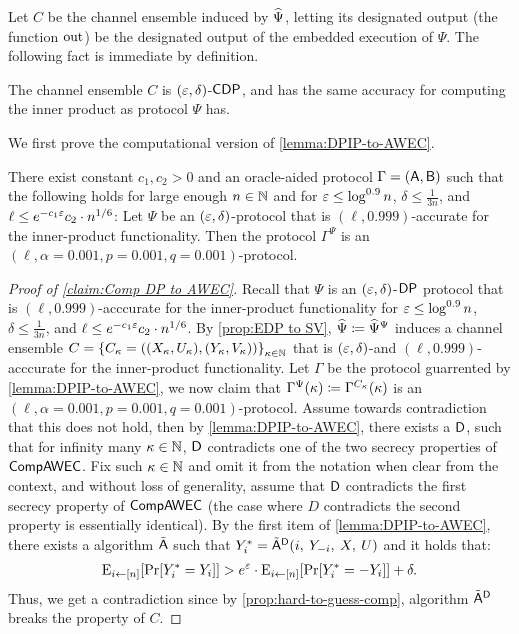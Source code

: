 Let $C$ be the channel ensemble induced by $\widehat{\Psi}$, letting its designated output (the function ${\rm out}$) be the designated output of the embedded execution of $\Psi$. The following fact is immediate by definition.

\begin{proposition}\label{prop:EDP to SV}
	The channel ensemble $C$ is $(\varepsilon,\delta)$-${\sf CDP}$, and has the same accuracy for computing the inner product as protocol $\Psi$ has.
\end{proposition}


We first prove the computational version of \cref{lemma:DPIP-to-AWEC}.
\begin{claim}\label{claim:Comp DP to AWEC}
    There exist constant $c_1,c_2 > 0$ and an oracle-aided \ppt protocol $\Gamma=(\mathsf{A},\mathsf{B})$ such that the following holds for large enough $n \in {\mathbb{N}}$ and for 
	$\varepsilon \leq \log^{0.9} n$, $\delta \leq \frac1{3n}$, and $\ell \leq e^{-c_1  \varepsilon}  c_2\cdot n^{1/6}$:
    Let $\Psi$ be an $(\varepsilon,\delta)$-\CDP protocol that is $(\ell,0.999)$-accurate for the inner-product functionality. Then the protocol $\Gamma^{\Psi}$ is an  $(\ell, \alpha=0.001, p=0.001, q=0.001)$-\CompAWEC protocol.
\end{claim}
\begin{proof}[Proof of \cref{claim:Comp DP to AWEC}]
Recall that $\Psi$ is an $(\varepsilon,\delta)$-${\sf DP}$ protocol that is $(\ell,0.999)$-acccurate for the inner-product functionality for 
	$\varepsilon \leq \log^{0.9} n$, $\delta \leq \frac1{3n}$, and $\ell \leq e^{-c_1  \varepsilon}  c_2\cdot n^{1/6}$. By \cref{prop:EDP to SV}, $\widehat{\Psi}\coloneqq\widehat{\Psi}^\Psi$ induces a channel ensemble $C=\set{C_\pk=((X_\pk,U_\pk),(Y_\pk,V_\pk))}_{\pk\in\N}$ that is $(\varepsilon,\delta)$-\CDP and $(\ell,0.999)$-acccurate for the inner-product functionality. Let $\Gamma$ be the \ppt protocol guarrented by \cref{lemma:DPIP-to-AWEC}, we now claim that $\Gamma^{\Psi}(\kappa)\coloneqq\Gamma^{C_\kappa}(\kappa)$ is an $(\ell, \alpha=0.001, p=0.001, q=0.001)$-\CompAWEC protocol. %
Assume towards contradiction that this does not hold, then by \cref{lemma:DPIP-to-AWEC}, there exists a \ppt $\mathsf{D}$, such that for infinity many $\kappa\in{\mathbb{N}}$, $\mathsf{D}$ contradicts one of the two secrecy properties of ${\sf CompAWEC}$. Fix such $\kappa\in{\mathbb{N}}$ and omit it from the notation when clear from the context, and without loss of generality, assume that $\mathsf{D}$ contradicts the first secrecy property of ${\sf CompAWEC}$ (the case where $D$ contradicts the second property is essentially identical). By the first item of \cref{lemma:DPIP-to-AWEC}, there exists a \ppt algorithm $\tilde{\mathsf{A}}$ such that 
$Y^*_i = {\tilde{\mathsf{A}}}^{\mathsf{D}}(i,\: Y_{-i}, \: X, \: U)$  and it holds that:
\begin{align*}
			\eex{i \la [n]}{\pr{Y^*_i = Y_i }} > e^{\eps} \cdot \eex{i \la [n]}{\pr{Y^*_i = -Y_i }} + \delta.
\end{align*}
Thus, we get a contradiction since by \cref{prop:hard-to-guess-comp}, algorithm ${\tilde{\mathsf{A}}}^{\mathsf{D}}$ breaks the \CDP property of $C$.  
\end{proof}


